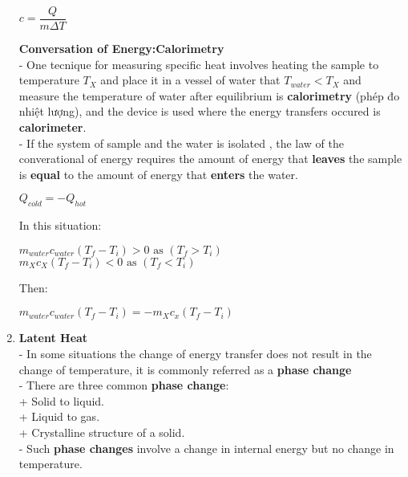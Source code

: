 \documentclass[10pt]{article}
\begin{document}
\begin{enumerate}
	\begin{mybox}
	\begin{center}
	$c = \dfrac{Q}{m \Delta T}$
	\end{center}
	\end{mybox}
	\textbf{Conversation of Energy:Calorimetry}\\
	- One tecnique for measuring specific heat involves heating the sample to temperature $T_X$ and place it in a vessel of water that $T_{water} < T_X$ and measure the temperature of water after equilibrium is \textbf{calorimetry} (phép đo nhiệt lượng), and the device is used where the energy transfers occured is \textbf{calorimeter}.\\
	- If the system of sample and the water is isolated , the law of the converational of energy requires the amount of energy that \textbf{leaves} the sample is \textbf{equal} to the amount of energy that \textbf{enters} the water.\\
	\begin{mybox}
	\begin{center}
	$Q_{cold} = -Q_{hot}$
	\end{center}
	\end{mybox}
	In this situation:
	\begin{center}
	$m_{water}c_{water}(T_f-T_i) > 0 \mbox{ as }(T_f > T_i)$\\
	$m_Xc_X(T_f-T_i) <0 \mbox{ as } (T_f < T_i)$\\
	\end{center}
    \pagebreak
	Then:
	\begin{mybox}
	\begin{center}
	 $m_{water}c_{water}(T_f-T_i) = -m_Xc_x(T_f-T_i)$
	 \end{center}
	 \end{mybox}
	 \item \textbf{Latent Heat}\\
	 - In some situations the change of energy transfer does not result in the change of temperature, it is commonly referred as a \textbf{phase change}\\
	 - There are three common \textbf{phase change}:\\
	  + Solid to liquid.\\
	  + Liquid to gas.\\
	  + Crystalline structure of a solid.\\
	 - Such \textbf{phase changes} involve a change in internal energy but no change in temperature.\\
	\begin{mybox}

\end{mybox}
\end{enumerate}
\end{document}
